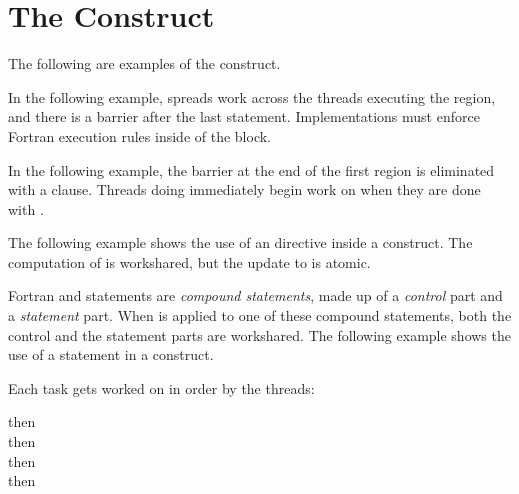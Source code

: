 \pagebreak
\section{The  Construct}
\fortranspecificstart
\label{sec:workshare}

The following are examples of the  construct. 

In the following example,  spreads work across the threads executing 
the  region, and there is a barrier after the last statement. 
Implementations must enforce Fortran execution rules inside of the  
block.


In the following example, the barrier at the end of the first  
region is eliminated with a  clause. Threads doing  immediately begin work on  when they are done with .

\begin{figure}[t!]
\end{figure}

The following example shows the use of an  directive inside a  
construct. The computation of  is workshared, but the update to 
 is atomic.


Fortran  and  statements are \emph{compound statements}, 
made up of a \emph{control} part and a \emph{statement} part. When  
is applied to one of these compound statements, both the control and the statement 
parts are workshared. The following example shows the use of a  statement 
in a  construct.

Each task gets worked on in order by the threads:

 then
\\
 then
\\
 then
\\
 then
\\

\begin{figure}[t!]
\end{figure}

